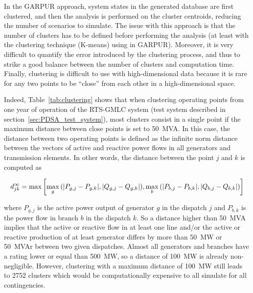 In the GARPUR approach, system states in the generated database are first clustered, and then the analysis is performed on the cluster centroids, reducing the number of scenarios to simulate. The issue with this approach is that the number of clusters has to be defined before performing the analysis (at least with the clustering technique (K-means) using in GARPUR). Moreover, it is very difficult to quantify the error introduced by the clustering process, and thus to strike a good balance between the number of clusters and computation time. Finally, clustering is difficult to use with high-dimensional data because it is rare for any two points to be ``close'' from each other in a high-dimensional space.

Indeed, Table~\ref{tab:clustering} shows that when clustering operating points from one year of operation of the RTS-GMLC system (test system described in section~\ref{sec:PDSA_test_system}), most clusters consist in a single point if the maximum distance between close points is set to 50~MVA. In this case, the distance between two operating points is defined as the infinite norm distance between the vectors of active and reactive power flows in all generators and transmission elements. In other words, the distance between the point \(j\) and \(k\) is computed as

\begin{equation}
d^{\infty}_{jk} = \max{\left[\max_g{\left(\lvert P_{g, j} - P_{g, k}\rvert, \lvert Q_{g, j} - Q_{g, k}\rvert\right)}, \max_b{\left(\lvert P_{b, j} - P_{b, k}\rvert, \lvert Q_{b, j} - Q_{b, k}\rvert\right)}\right]}
\end{equation}

\noindent where \(P_{g, j}\) is the active power output of generator \(g\) in the dispatch \(j\) and \(P_{b, k}\) is the power flow in branch \(b\) in the dispatch \(k\). So a distance higher than 50~MVA implies that the active or reactive flow in at least one line and/or the active or reactive production of at least generator differs by more than 50~MW or 50~MVAr between two given dispatches. Almost all generators and branches have a rating lower or equal than 500~MW, so a distance of 100~MW is already non-negligible. However, clustering with a maximum distance of 100~MW still leads to 2752 clusters which would be computationally expensive to all simulate for all contingencies.

